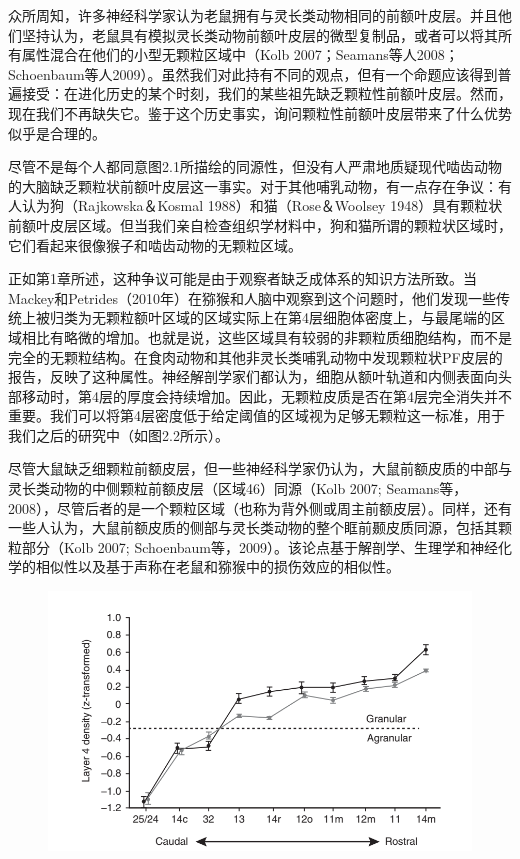 众所周知，许多神经科学家认为老鼠拥有与灵长类动物相同的前额叶皮层。并且他们坚持认为，老鼠具有模拟灵长类动物前额叶皮层的微型复制品，或者可以将其所有属性混合在他们的小型无颗粒区域中（Kolb 2007；Seamans等人2008；Schoenbaum等人2009）。虽然我们对此持有不同的观点，但有一个命题应该得到普遍接受：在进化历史的某个时刻，我们的某些祖先缺乏颗粒性前额叶皮层。然而，现在我们不再缺失它。鉴于这个历史事实，询问颗粒性前额叶皮层带来了什么优势似乎是合理的。

尽管不是每个人都同意图2.1所描绘的同源性，但没有人严肃地质疑现代啮齿动物的大脑缺乏颗粒状前额叶皮层这一事实。对于其他哺乳动物，有一点存在争议：有人认为狗（Rajkowska＆Kosmal 1988）和猫（Rose＆Woolsey 1948）具有颗粒状前额叶皮层区域。但当我们亲自检查组织学材料中，狗和猫所谓的颗粒状区域时，它们看起来很像猴子和啮齿动物的无颗粒区域。

正如第1章所述，这种争议可能是由于观察者缺乏成体系的知识方法所致。当Mackey和Petrides（2010年）在猕猴和人脑中观察到这个问题时，他们发现一些传统上被归类为无颗粒额叶区域的区域实际上在第4层细胞体密度上，与最尾端的区域相比有略微的增加。也就是说，这些区域具有较弱的非颗粒质细胞结构，而不是完全的无颗粒结构。在食肉动物和其他非灵长类哺乳动物中发现颗粒状PF皮层的报告，反映了这种属性。神经解剖学家们都认为，细胞从额叶轨道和内侧表面向头部移动时，第4层的厚度会持续增加。因此，无颗粒皮质是否在第4层完全消失并不重要。我们可以将第4层密度低于给定阈值的区域视为足够无颗粒这一标准，用于我们之后的研究中（如图2.2所示）。

尽管大鼠缺乏细颗粒前额皮层，但一些神经科学家仍认为，大鼠前额皮质的中部与灵长类动物的中侧颗粒前额皮层（区域46）同源（Kolb 2007; Seamans等，2008），尽管后者的是一个颗粒区域（也称为背外侧或周主前额皮层）。同样，还有一些人认为，大鼠前额皮质的侧部与灵长类动物的整个眶前颞皮质同源，包括其颗粒部分（Kolb 2007; Schoenbaum等，2009）。该论点基于解剖学、生理学和神经化学的相似性以及基于声称在老鼠和猕猴中的损伤效应的相似性。

\begin{figure}
	\centering
	\includegraphics[width=0.7\linewidth]{image_pfc/Fig_2_2}
\end{figure}

